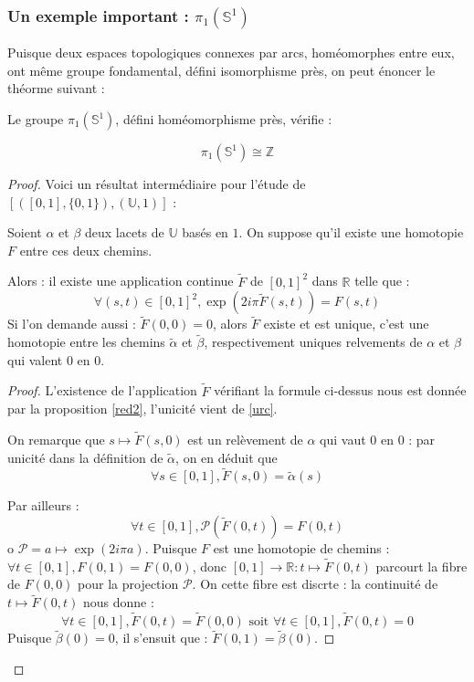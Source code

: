 \subsubsection{Un exemple important : $\pi_1(\mathbb{S}^1)$}\label{gs1}

Puisque deux espaces topologiques connexes par arcs, hom\'eomorphes entre eux, ont m\^eme groupe fondamental, d\'efini  isomorphisme pr\`es, on peut \'enoncer le th\'eorme suivant :

\begin{theo}
Le groupe $\pi_1(\mathbb{S}^1)$, d\'efini  hom\'eomorphisme pr\`es, v\'erifie :

\[\pi_1(\mathbb{S}^1)\cong\mathbb{Z}\]
\end{theo}

\begin{proof}
Voici un r\'esultat interm\'ediaire pour l'\'etude de $[([0,1],\{0,1\}),(\mathbb{U},1)]$ :

\begin{lemm}
Soient $\alpha$ et $\beta$ deux lacets de $\mathbb{U}$ bas\'es en $1$. On suppose qu'il existe une homotopie $F$ entre ces deux chemins.

Alors : il existe une application continue $\tilde{F}$ de $[0,1]^2$ dans $\mathbb{R}$ telle que :
\[\forall (s,t)\in[0,1]^2 , \exp(2i\pi \tilde{F}(s,t))=F(s,t)\]
Si l'on demande aussi : $\tilde{F}(0,0)=0$, alors $\tilde{F}$ existe et est unique, %
c'est une homotopie entre les chemins $\tilde{\alpha}$ et $\tilde{\beta}$, respectivement uniques relvements de $\alpha$ et $\beta$ qui valent $0$ en $0$.
\end{lemm}

\begin{proof}
L'existence de l'application $\tilde{F}$ v\'erifiant la formule ci-dessus nous est donn\'ee par la proposition \ref{red2}, l'unicit\'e vient de \ref{urc}.

On remarque que $s\mapsto \tilde{F}(s,0)$ est un rel\`evement de $\alpha$ qui vaut $0$ en $0$ : par unicit\'e dans la d\'efinition de $\tilde{\alpha}$, on en d\'eduit que
\[\forall s\in [0,1],\tilde{F}(s,0)=\tilde{\alpha}(s)\]

Par ailleurs :
\[\forall t\in [0,1],\mathcal{P}(\tilde{F}(0,t))=F(0,t)\]
o $\mathcal{P}=a\mapsto\exp (2i\pi a)$.
Puisque $F$ est une homotopie de chemins : $\forall t\in[0,1], F(0,1)=F(0,0)$, %
donc $[0,1]\rightarrow\mathbb{R}:t\mapsto\tilde{F}(0,t)$ parcourt la fibre de $F(0,0)$ pour la projection $\mathcal{P}$. %
On cette fibre est discrte : la continuit\'e de $t\mapsto \tilde{F}(0,t)$ nous donne :
\[\forall t\in[0,1],\tilde{F}(0,t)=\tilde{F}(0,0)\text{ soit }\forall t\in[0,1],\tilde{F}(0,t)=0\]
Puisque $\tilde{\beta}(0)=0$, il s'ensuit que : $\tilde{F}(0,1)=\tilde{\beta}(0)$.


\end{proof}
\end{proof}
